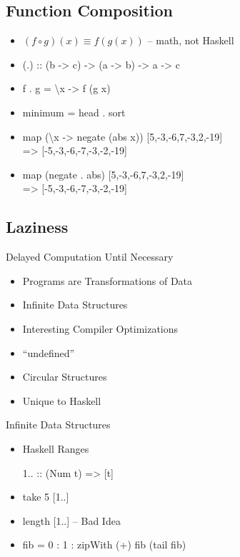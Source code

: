 \documentclass{beamer}                  %
\newcommand{\srule}{
	\rule{\textwidth}{1pt}\\
}
\newlength{\subsecwidth}
\newenvironment{slide}{
	\begin{frame} %
	\settowidth{\subsecwidth}{\insertsubsection} %
	\ifthenelse{\dimtest{\subsecwidth}{<}{1pt}}{ %
		\frametitle{\insertsection\\             %
		\vspace{-1ex}                            %
		\color{fore}\srule                       %
		\par                                     %
		\vspace{-3ex}                            %
		}
	}{                                           %
		\frametitle{\insertsection\ -- \insertsubsection\\ %
		\vspace{-1ex}                            %
		\color{fore}\srule                       %
		\par                                     %
		\vspace{-3ex}                            %
		}
	}
	\Large                                       %
}{
	\end{frame}
}
\begin{document}
\subsection{Function Composition}

\begin{slide}
  \begin{itemize}
    \item \((f \circ g)(x) \equiv f(g(x))\) -- math, not Haskell
    \item (.) :: (b -> c) -> (a -> b) -> a -> c
    \item f . g = \textbackslash x -> f (g x)
    \item minimum = head . sort
    \item{}{}
      map (\textbackslash x -> negate (abs x)) [5,-3,-6,7,-3,2,-19]\\
      => [-5,-3,-6,-7,-3,-2,-19]
    \item{}{}
      map (negate . abs) [5,-3,-6,7,-3,2,-19]\\
      => [-5,-3,-6,-7,-3,-2,-19]
  \end{itemize}
\end{slide}

\subsection{Laziness}

\begin{slide}
  Delayed Computation Until Necessary
  \begin{itemize}
    \item Programs are Transformations of Data
    \item Infinite Data Structures
    \item Interesting Compiler Optimizations
    \item ``undefined''
    \item Circular Structures
    \item Unique to Haskell
  \end{itemize}
\end{slide}

\begin{slide}
  Infinite Data Structures
  \begin{itemize}
    \item Haskell Ranges
    \item  [1..] :: (Num t) => [t]
    \item take 5 [1..]
    \item length [1..] -- Bad Idea
    \item fib = 0 : 1 : zipWith (+) fib (tail fib)
  \end{itemize}
\end{slide}
\end{document}
